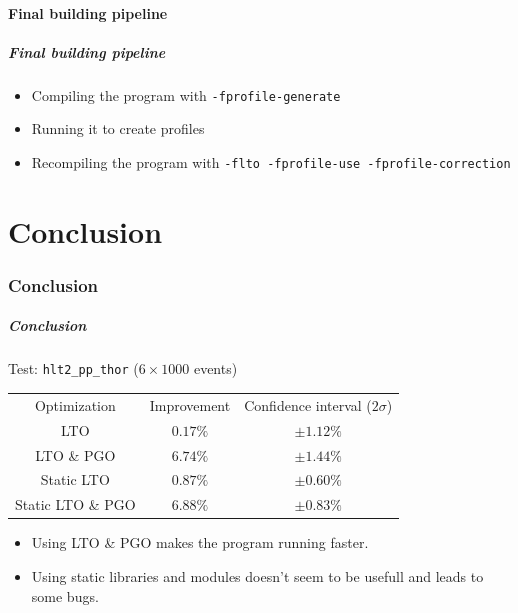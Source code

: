 \documentclass{beamer}
\begin{document}
\subsection{Final building pipeline}

\begin{frame}[fragile]
    \frametitle{Final building pipeline}

    \begin{itemize}
        \item Compiling the program with \verb'-fprofile-generate'
        \item Running it to create profiles
        \item Recompiling the program with \verb'-flto -fprofile-use -fprofile-correction'
    \end{itemize}
\end{frame}

\part{Conclusion}
\section*{Conclusion}

\begin{frame}[fragile]
    \frametitle{Conclusion}

    Test: \verb'hlt2_pp_thor' ($6 \times 1000$ events)
    \begin{center}
        \begin{tabular}{ c c c }
            Optimization      & Improvement & Confidence interval ($2\sigma$) \\
            LTO               & $0.17\%$    & $\pm 1.12\%$                    \\
            LTO \& PGO        & $6.74\%$    & $\pm 1.44\%$                    \\
            Static LTO        & $0.87\%$    & $\pm 0.60\%$                    \\
            Static LTO \& PGO & $6.88\%$    & $\pm 0.83\%$
        \end{tabular}
    \end{center}

    \begin{itemize}
        \item Using LTO \& PGO makes the program running faster.
        \item Using static libraries and modules doesn't seem to be usefull and leads to some bugs.
    \end{itemize}
\end{frame}
\end{document}
